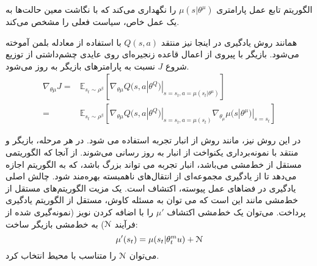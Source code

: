 الگوریتم 
تابع عمل پارامتری
$
\mu (s|\theta^\mu)	
$
را نگهداری می‌کند که با نگاشت معین حالت‌ها به یک عمل خاص، سیاست فعلی را مشخص می‌کند.

همانند روش یادگیری 
در اینجا نیز منتقد
$Q(s,a)$
با استفاده از معادله بلمن آموخته می‌شود.
بازیگر با پیروی از اعمال قاعده زنجیره‌ای روی عایدی چشم‌داشتی از توزیع شروع
$J$
نسبت به پارامترهای بازیگر به روز می‌شود.
\begin{align}
	\nabla_{\theta \mu} J = & \mathbb{E}_{s_t \sim \rho ^{ \beta}} [ \nabla_{\theta \mu} Q(s,a|\theta^Q)|_{s=s_t,a=\mu (s_t|\theta^{\mu})}  ] \\ \nonumber
	= & \mathbb{E}_{s_t \sim \rho ^{ \beta}} [ \nabla_{\theta \mu} Q(s,a|\theta^Q)|_{s=s_t, a=\mu (s_t)} \nabla_{\theta_{\mu}} \mu (s|\theta^{\mu})|_{s=s_t} ]
\end{align}

در این روش نیز، مانند روش 
از انبار تجربه استفاده می شود. 
در هر مرحله، بازیگر و منتقد با نمونه‌برداری یکنواخت از انبار به روز رسانی می‌شوند. از آنجا که 
الگوریتمی مستقل از خط‌مشی می‌باشد، انبار تجربه می تواند بزرگ باشد، که به الگوریتم اجازه می‌دهد تا از یادگیری مجموعه‌ای از انتقال‌های ناهمبسته بهره‌مند شود.
چالش اصلی یادگیری در فضاهای عمل پیوسته، اکتشاف است. یک مزیت  الگوریتم‌های مستقل از خط‌مشی مانند 
این است که می توان به مسئله کاوش،  مستقل از الگوریتم یادگیری پرداخت.
می‌توان یک خط‌مشی اکتشاف 
$\mu'$
را با اضافه کردن نویز (نمونه‌گیری شده از فرآیند $\EuScript{N}$) به خط‌مشی بازیگر ساخت:
\begin{equation}
\mu'(s_t) = \mu(s_t|\theta_t^mu) + \EuScript{N}
\end{equation}
می‌توان $\EuScript{N}$ 
را متناسب با محیط انتخاب کرد.


